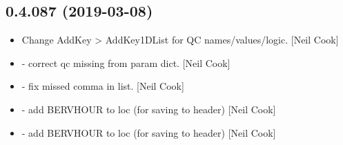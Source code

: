 \documentclass[a4paper,10pt,english]{report}
\begin{document}
\subsection{0.4.087 (2019-03-08)}
\label{\detokenize{misc/changelog:id174}}\begin{itemize}
\item {} 
Change AddKey \textendash{}\textgreater{} AddKey1DList for QC names/values/logic. {[}Neil Cook{]}

\item {} 
 - correct qc missing from param dict. {[}Neil
Cook{]}

\item {} 
 - fix missed comma in list. {[}Neil Cook{]}

\item {} 
 - add BERVHOUR to loc (for saving to header) {[}Neil Cook{]}

\item {} 
 - add BERVHOUR to loc (for saving to header) {[}Neil Cook{]}

\end{itemize}
\end{document}
